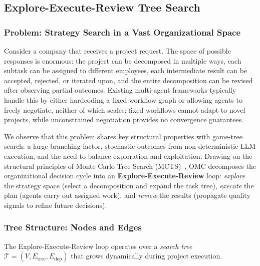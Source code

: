 \documentclass[11pt,a4paper]{article}
\begin{document}
\subsection{Explore-Execute-Review Tree Search}
\label{sec:explore-review}

\subsubsection{Problem: Strategy Search in a Vast Organizational Space}

Consider a company that receives a project request. The space of possible responses is enormous: the project can be decomposed in multiple ways, each subtask can be assigned to different employees, each intermediate result can be accepted, rejected, or iterated upon, and the entire decomposition can be revised after observing partial outcomes. Existing multi-agent frameworks typically handle this by either hardcoding a fixed workflow graph or allowing agents to freely negotiate, neither of which scales: fixed workflows cannot adapt to novel projects, while unconstrained negotiation provides no convergence guarantees.

We observe that this problem shares key structural properties with game-tree search: a large branching factor, stochastic outcomes from non-deterministic LLM execution, and the need to balance exploration and exploitation.
Drawing on the structural principles of Monte Carlo Tree Search (MCTS)~\cite{kocsis2006bandit}, OMC decomposes the organizational decision cycle into an \textbf{Explore-Execute-Review} loop: \emph{explore} the strategy space (select a decomposition and expand the task tree), \emph{execute} the plan (agents carry out assigned work), and \emph{review} the results (propagate quality signals to refine future decisions).

\subsubsection{Tree Structure: Nodes and Edges}

The Explore-Execute-Review loop operates over a \emph{search tree} $\mathcal{T} = (V, E_{\text{tree}}, E_{\text{dep}})$ that grows dynamically during project execution.
\end{document}
